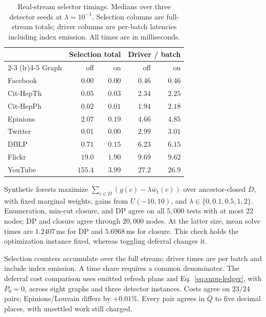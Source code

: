 \begin{table}[tb]\centering
\caption{Real-stream selector timings.
Medians over three detector seeds at $\lambda=10^{-1}$.
Selection columns are full-stream totals; driver columns are per-batch
latencies including index emission. All times are in milliseconds.}
\label{tab:selector-real}
\label{tab:defer-seltime}
\begin{footnotesize}
\setlength{\tabcolsep}{0.3em}
\begin{tabular*}{\linewidth}{@{\extracolsep{\fill}}lrrrr@{}}
\toprule
& \multicolumn{2}{c}{Selection total} & \multicolumn{2}{c}{Driver / batch} \\
\cmidrule(lr){2-3} \cmidrule(lr){4-5}
Graph & off & on & off & on \\
\midrule
Facebook & $0.00$ & $0.00$ & $0.46$ & $0.46$ \\
Cit-HepTh & $0.05$ & $0.03$ & $2.34$ & $2.25$ \\
Cit-HepPh & $0.02$ & $0.01$ & $1.94$ & $2.18$ \\
Epinions & $2.07$ & $0.19$ & $4.66$ & $4.85$ \\
Twitter & $0.01$ & $0.00$ & $2.99$ & $3.01$ \\
DBLP & $0.71$ & $0.15$ & $6.23$ & $6.15$ \\
Flickr & $19.0$ & $1.90$ & $9.69$ & $9.62$ \\
YouTube & $155.4$ & $3.99$ & $27.2$ & $26.9$ \\
\bottomrule
\end{tabular*}
\end{footnotesize}
\end{table}

 Synthetic forests maximize
$\sum_{c\in D}(g(c)-\lambda\bar w_t(c))$ over ancestor-closed $D$, with
fixed marginal weights, gains from $U(-10,10)$, and
$\lambda\in\{0,0.1,0.5,1,2\}$. Enumeration, min-cut closure, and DP
agree on all $5{,}000$ tests with at most $22$ nodes; DP and closure agree
through $20{,}000$ nodes. At the latter size, mean solve times are
$1.2407$\,ms for DP and $5.6968$\,ms for closure. This check holds the
optimization instance fixed, whereas toggling deferral changes it.

 Selection counters accumulate over
the full stream; driver times are per batch and include index emission.
A time share requires a common denominator. The deferral cost comparison
uses emitted refresh plans and Eq.~\ref{eq:supp-ledger}, with $P_0=0$,
across eight graphs and three detector instances. Costs agree on $23/24$
pairs; Epinions/Louvain differs by $+0.01\%$. Every pair agrees in
$\bar Q$ to five decimal places, with unsettled work still charged.

